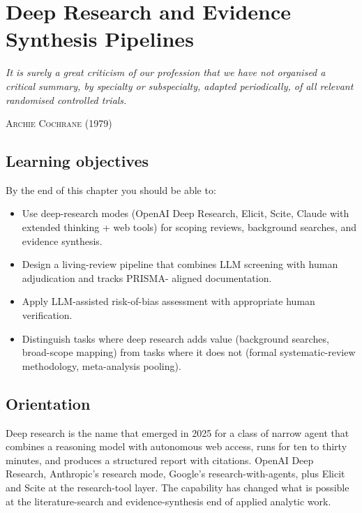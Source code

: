 \documentclass[
  letterpaper,
  11pt]{scrbook}
\providecommand{\tightlist}{%
  \setlength{\itemsep}{0pt}\setlength{\parskip}{0pt}}
\begin{document}
\chapter{Deep Research and Evidence Synthesis
Pipelines}\label{sec-deep-research}

\begin{flushright}\small

\emph{It is surely a great criticism of our profession that we have not
organised a critical summary, by specialty or subspecialty, adapted
periodically, of all relevant randomised controlled trials.}

\textsc{Archie Cochrane} (1979)

\end{flushright}

\section{Learning objectives}\label{learning-objectives-8}

By the end of this chapter you should be able to:

\begin{itemize}
\tightlist
\item
  Use deep-research modes (OpenAI Deep Research, Elicit, Scite, Claude
  with extended thinking + web tools) for scoping reviews, background
  searches, and evidence synthesis.
\item
  Design a living-review pipeline that combines LLM screening with human
  adjudication and tracks PRISMA- aligned documentation.
\item
  Apply LLM-assisted risk-of-bias assessment with appropriate human
  verification.
\item
  Distinguish tasks where deep research adds value (background searches,
  broad-scope mapping) from tasks where it does not (formal
  systematic-review methodology, meta-analysis pooling).
\end{itemize}

\section{Orientation}\label{orientation-8}

Deep research is the name that emerged in 2025 for a class of narrow
agent that combines a reasoning model with autonomous web access, runs
for ten to thirty minutes, and produces a structured report with
citations. OpenAI Deep Research, Anthropic's research mode, Google's
research-with-agents, plus Elicit and Scite at the research-tool layer.
The capability has changed what is possible at the literature-search and
evidence-synthesis end of applied analytic work.
\end{document}

